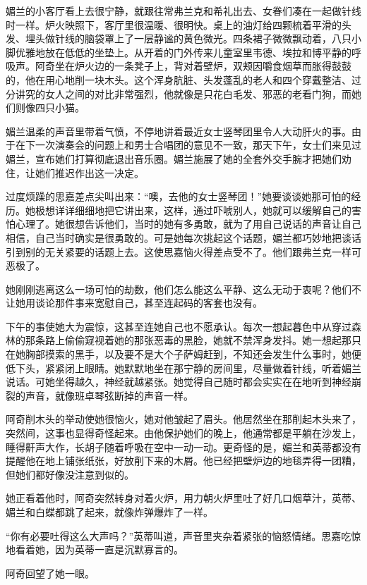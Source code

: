 \par 媚兰的小客厅看上去很宁静，就跟往常弗兰克和希礼出去、女眷们凑在一起做针线时一样。炉火映照下，客厅里很温暖、很明快。桌上的油灯给四颗梳着平滑的头发、埋头做针线的脑袋罩上了一层静谧的黄色微光。四条裙子微微飘动着，八只小脚优雅地放在低低的坐垫上。从开着的门外传来儿童室里韦德、埃拉和博平静的呼吸声。阿奇坐在炉火边的一条凳子上，背对着壁炉，双颊因嚼食烟草而胀得鼓鼓的，他在用心地削一块木头。这个浑身肮脏、头发蓬乱的老人和四个穿戴整洁、过分讲究的女人之间的对比非常强烈，他就像是只花白毛发、邪恶的老看门狗，而她们则像四只小猫。
\par 媚兰温柔的声音里带着气愤，不停地讲着最近女士竖琴团里令人大动肝火的事。由于在下一次演奏会的问题上和男士合唱团的意见不一致，那天下午，女士们来见过媚兰，宣布她们打算彻底退出音乐圈。媚兰施展了她的全套外交手腕才把她们劝住，让她们推迟作出这一决定。
\par 过度烦躁的思嘉差点尖叫出来：“噢，去他的女士竖琴团！”她要谈谈她那可怕的经历。她极想详详细细地把它讲出来，这样，通过吓唬别人，她就可以缓解自己的害怕心理了。她很想告诉他们，当时的她有多勇敢，就为了用自己说话的声音让自己相信，自己当时确实是很勇敢的。可是她每次挑起这个话题，媚兰都巧妙地把谈话引到别的无关紧要的话题上去。这使思嘉恼火得差点受不了。他们跟弗兰克一样可恶极了。
\par 她刚刚逃离这么一场可怕的劫数，他们怎么能这么平静、这么无动于衷呢？他们不让她用谈论那件事来宽慰自己，甚至连起码的客套也没有。
\par 下午的事使她大为震惊，这甚至连她自己也不愿承认。每次一想起暮色中从穿过森林的那条路上偷偷窥视着她的那张恶毒的黑脸，她就不禁浑身发抖。她一想起那只在她胸部摸索的黑手，以及要不是大个子萨姆赶到，不知还会发生什么事时，她便低下头，紧紧闭上眼睛。她默默地坐在那宁静的房间里，尽量做着针线，听着媚兰说话。可她坐得越久，神经就越紧张。她觉得自己随时都会实实在在地听到神经崩裂的声音，就像班卓琴弦断掉的声音一样。
\par 阿奇削木头的举动使她很恼火，她对他皱起了眉头。他居然坐在那削起木头来了，突然间，这事也显得奇怪起来。由他保护她们的晚上，他通常都是平躺在沙发上，睡得鼾声大作，长胡子随着呼吸在空中一动一动。更奇怪的是，媚兰和英蒂都没有提醒他在地上铺张纸张，好放削下来的木屑。他已经把壁炉边的地毯弄得一团糟，但她们都好像没注意到似的。
\par 她正看着他时，阿奇突然转身对着火炉，用力朝火炉里吐了好几口烟草汁，英蒂、媚兰和白蝶都跳了起来，就像炸弹爆炸了一样。
\par “你有必要吐得这么大声吗？”英蒂叫道，声音里夹杂着紧张的恼怒情绪。思嘉吃惊地看着她，因为英蒂一直是沉默寡言的。
\par 阿奇回望了她一眼。
